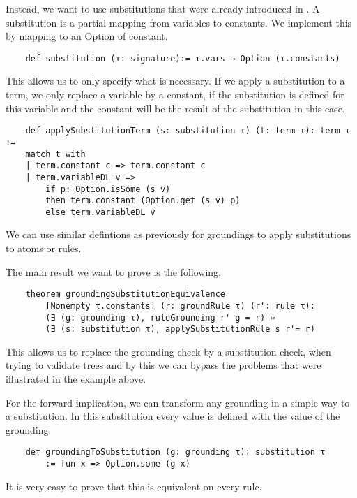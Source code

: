     Instead, we want to use substitutions that were already introduced in \cite{datalogCoq}. A substitution is a partial mapping from variables to constants. We implement this by mapping to an Option of constant.

    \begin{lstlisting}
    def substitution (τ: signature):= τ.vars → Option (τ.constants)
    \end{lstlisting}

    This allows us to only specify what is necessary. If we apply a substitution to a term, we only replace a variable by a constant, if the substitution is defined for this variable and the constant will be the result of the substitution in this case.

    \begin{lstlisting}
    def applySubstitutionTerm (s: substitution τ) (t: term τ): term τ :=
    match t with
    | term.constant c => term.constant c
    | term.variableDL v => 
        if p: Option.isSome (s v) 
        then term.constant (Option.get (s v) p) 
        else term.variableDL v
    \end{lstlisting}

    We can use similar defintions as previously for groundings to apply substitutions to atoms or rules.

    The main result we want to prove is the following.

    \begin{lstlisting}
    theorem groundingSubstitutionEquivalence 
        [Nonempty τ.constants] (r: groundRule τ) (r': rule τ):
        (∃ (g: grounding τ), ruleGrounding r' g = r) ↔ 
        (∃ (s: substitution τ), applySubstitutionRule s r'= r)
    \end{lstlisting}

    This allows us to replace the grounding check by a substitution check, when trying to validate trees and by this we can bypass the problems that were illustrated in the example above. 

    For the forward implication, we can transform any grounding in a simple way to a substitution. In this substitution every value is defined with the value of the grounding.

    \begin{lstlisting}
    def groundingToSubstitution (g: grounding τ): substitution τ
        := fun x => Option.some (g x)
    \end{lstlisting}

    It is very easy to prove that this is equivalent on every rule.

